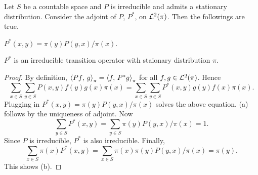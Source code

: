 \begin{lemma}\label{lem:transition_adjoint}
    Let $S$ be a countable space and $P$ is irreducible and admits a stationary 
    distribution. Consider the adjoint of $P$, $P^*$, on $\mathcal{L}^2(\pi)$. Then 
    the followings are true. 
    \begin{thmenum}
        \item $P^*(x,y) = \pi(y)P(y,x)/\pi(x)$. 
        \item $P^*$ is an irreducible transition operator with staionary distribution 
        $\pi$. 
    \end{thmenum}
\end{lemma}
\begin{proof}
    By definition, $\left\langle {Pf},\, {g} \right\rangle_\pi = \left\langle {f},\, {P^*g} \right\rangle_\pi$ for all $f,g\in\mathcal{L}^2(\pi)$. 
    Hence 
    \begin{equation*}
        \sum_{x\in S}\sum_{y\in S}P(x,y)f(y)g(x)\pi(x) = \sum_{x\in S}\sum_{y\in S}P^*(x,y)g(y)f(x)\pi(x). 
    \end{equation*}
    Plugging in $P^*(x,y) = \pi(y)P(y,x)/\pi(x)$ solves the above equation. 
    (a) follows by the uniqueness of adjoint. Now 
    \begin{equation*}
        \sum_{y\in S}P^*(x,y) = \sum_{y\in S}\pi(y)P(y,x)/\pi(x) = 1.
    \end{equation*} 
    Since $P$ is irreducible, $P^*$ is also irreducible. Finally, 
    \begin{equation*}
        \sum_{x\in S}\pi(x)P^*(x,y) = \sum_{x\in S}\pi(x)\pi(y)P(y,x)/\pi(x) = \pi(y). 
    \end{equation*}
    This shows (b). 
\end{proof}

